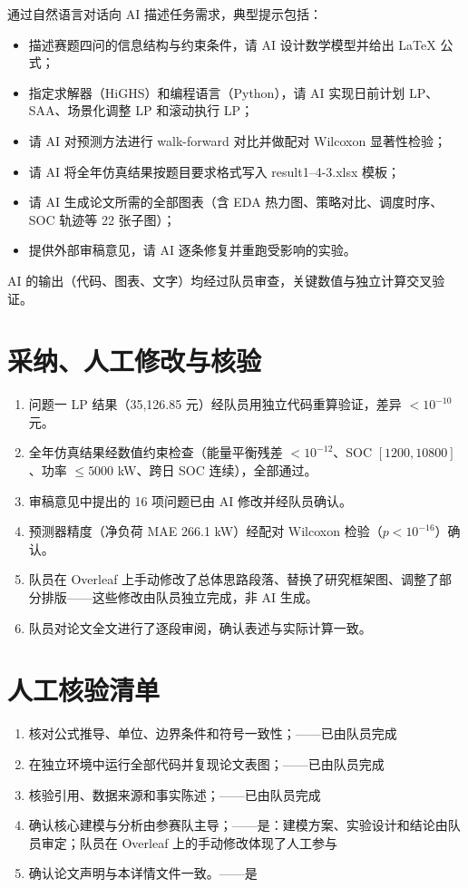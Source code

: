 \documentclass[zihao=-4,a4paper,UTF8,fontset=fandol]{ctexart}
\begin{document}
通过自然语言对话向 AI 描述任务需求，典型提示包括：
\begin{itemize}
  \item 描述赛题四问的信息结构与约束条件，请 AI 设计数学模型并给出 LaTeX 公式；
  \item 指定求解器（HiGHS）和编程语言（Python），请 AI 实现日前计划 LP、SAA、场景化调整 LP 和滚动执行 LP；
  \item 请 AI 对预测方法进行 walk-forward 对比并做配对 Wilcoxon 显著性检验；
  \item 请 AI 将全年仿真结果按题目要求格式写入 result1--4-3.xlsx 模板；
  \item 请 AI 生成论文所需的全部图表（含 EDA 热力图、策略对比、调度时序、SOC 轨迹等 22 张子图）；
  \item 提供外部审稿意见，请 AI 逐条修复并重跑受影响的实验。
\end{itemize}
AI 的输出（代码、图表、文字）均经过队员审查，关键数值与独立计算交叉验证。

\section{采纳、人工修改与核验}

\begin{enumerate}
  \item 问题一 LP 结果（35,126.85 元）经队员用独立代码重算验证，差异 $<10^{-10}$ 元。
  \item 全年仿真结果经数值约束检查（能量平衡残差 $<10^{-12}$、SOC $[1200,10800]$、功率 $\le 5000$ kW、跨日 SOC 连续），全部通过。
  \item 审稿意见中提出的 16 项问题已由 AI 修改并经队员确认。
  \item 预测器精度（净负荷 MAE 266.1 kW）经配对 Wilcoxon 检验（$p<10^{-16}$）确认。
  \item 队员在 Overleaf 上手动修改了总体思路段落、替换了研究框架图、调整了部分排版——这些修改由队员独立完成，非 AI 生成。
  \item 队员对论文全文进行了逐段审阅，确认表述与实际计算一致。
\end{enumerate}

\section{人工核验清单}

\begin{enumerate}[label=\arabic*)]
  \item 核对公式推导、单位、边界条件和符号一致性；——已由队员完成
  \item 在独立环境中运行全部代码并复现论文表图；——已由队员完成
  \item 核验引用、数据来源和事实陈述；——已由队员完成
  \item 确认核心建模与分析由参赛队主导；——是：建模方案、实验设计和结论由队员审定；队员在 Overleaf 上的手动修改体现了人工参与
  \item 确认论文声明与本详情文件一致。——是
\end{enumerate}
\end{document}
